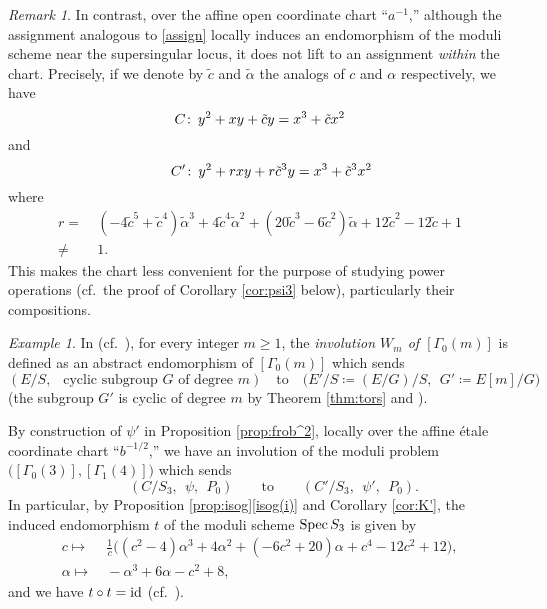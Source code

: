 \documentclass{gtpart}
\theoremstyle{definition}
\theoremstyle{remark}
\newtheorem{rmk}[thm]{Remark}
\newtheorem{ex}[thm]{Example}
\def\co{\colon\thinspace}
\newcommand{\Spec}{{\rm Spec\thinspace}}
\newcommand{\TA}{\tilde{\A}}
\newcommand{\Tc}{\tilde{c}}
\newcommand{\id}{{\rm id}}
\newcommand{\A}{\alpha}
\newcommand{\G}{\Gamma}
\newcommand{\ce}{\coloneqq}
\newcommand{\isog}[1]{Proposition \ref{prop:isog}\thinspace \eqref{isog(#1)}}
\numberwithin{equation}{section}
\numberwithin{thm}{section}
\begin{document}
\begin{rmk}
 In contrast, over the affine open coordinate chart ``$a^{-1}$,'' 
 although the assignment analogous to \eqref{assign} locally induces an 
 endomorphism of the moduli scheme near the supersingular locus, it does 
 not lift to an assignment {\em within} the chart.  Precisely, if we 
 denote by $\Tc$ and $\TA$ the analogs of $c$ and $\A$ respectively, we 
 have 
 \[
  C \co y^2 + x y + \Tc y = x^3 + \Tc x^2 
 \]
 and 
 \[
  \quad ~~ C' \co y^2 + r x y + r \Tc^3 y = x^3 + \Tc^3 x^2 
 \]
 where 
 \begin{equation*}
 \begin{split}
   r = & ~ (-4 \Tc^5 + \Tc^4) \TA^3 + 4 \Tc^4 \TA^2 + (20 \Tc^3 - 6 \Tc^2) \TA + 12 \Tc^2 - 12 \Tc + 1 \\
  \neq & ~ 1.  
 \end{split}
 \end{equation*}
 This makes the chart less convenient for the purpose of studying power 
 operations (cf.~the proof of Corollary \ref{cor:psi3} below), 
 particularly their compositions.  
\end{rmk}

\begin{ex}
\label{ex:ab3}
 In \cite[11.3.1]{KM} (cf.~\cite[Lemmas 7-10]{atkinlehner}), for every 
 integer $m \geq 1$, the {\em involution $W_m$ of $[\G_0(m)]$} is 
 defined as an abstract endomorphism of $[\G_0(m)]$ which sends 
 \[
  (E/S, ~~ \text{~cyclic subgroup~} G \text{~of degree~} m) \quad 
  \text{to} \quad \big( E'/S \ce (E/G)/S, ~~ G' \ce E[m]/G \big) 
 \]
 (the subgroup $G'$ is cyclic of degree $m$ by Theorem \ref{thm:tors} 
 and \cite[12.2.5]{KM}).  

 By construction of $\psi'$ in Proposition \ref{prop:frob^2}, locally 
 over the affine \'etale coordinate chart ``$b^{-1/2}$,'' we have an 
 involution of the moduli problem $\big( [\G_0(3)], [\G_1(4)] \big)$ 
 which sends 
 \[
  \qquad (C/S_3, ~~ \psi, ~~ P_0) \qquad \text{to} \qquad 
  (C'/S_3, ~~ \psi', ~~ P_0).  
 \]
 In particular, by \isog{i} and Corollary \ref{cor:K'}, the induced 
 endomorphism $t$ of the moduli scheme $\Spec S_3$ is given by 
 \begin{equation*}
 \begin{split}
   c \longmapsto & ~ \frac{1}{c} \big( (c^2 - 4) \A^3 + 4 \A^2 + (-6 c^2 + 20) \A + c^4 - 12 c^2 + 12 \big), \\
  \A \longmapsto & ~ -\A^3 + 6 \A - c^2 + 8, 
 \end{split}
 \end{equation*}
 and we have $t \circ t = \id$ (cf.~\cite[Section 5]{tmf3}).  
\end{ex}
\end{document}
